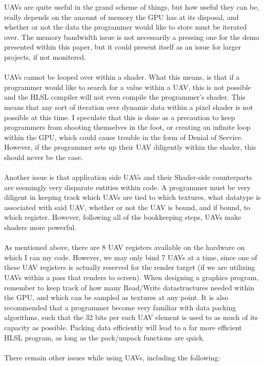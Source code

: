 \documentclass[a4paper, 12pt]{article}
\begin{document}
UAVs are quite useful in the grand scheme of things, but how useful they can
be, really depends on the amount of memory the GPU has at its disposal, and
whether or not the data the programmer would like to store must be iterated
over. The memory bandwidth issue is not necessarily a pressing one for the
demo presented within this paper, but it could present itself as an issue for
larger projects, if not monitered. \\ \\ UAVs cannot be looped over within a
shader. What this means, is that if a programmer would like to search for a
value within a UAV, this is not possible and the HLSL compiler will not even
compile the programmer's shader. This means that any sort of iteration over
dynamic data within a pixel shader is not possible at this time. I speculate
that this is done as a precaution to keep programmers from shooting themselves
in the foot, or creating an infinite loop within the GPU, which could cause
trouble in the form of Denial of Service. However, if the programmer sets up
their UAV diligently within the shader, this should never be the case. \\ \\
Another issue is that application side UAVs and their Shader-side counterparts
are seemingly very disparate entities within code. A programmer must be very
diligent in keeping track which UAVs are tied to which textures, what datatype
is associated with said UAV, whether or not the UAV is bound, and if bound, to
which register. However, following all of the bookkeeping steps, UAVs make
shaders more powerful. \\ \\ As mentioned above, there are 8 UAV registers
available on the hardware on which I ran my code. However, we may only bind 7
UAVs at a time, since one of these UAV registers is actually reserved for the
render target (if we are utilizing UAVs within a pass that renders to screen).
When designing a graphics program, remember to keep track of how many
Read/Write datastructures needed within the GPU, and which can be sampled as
textures at any point. It is also recommended that a programmer become very
familiar with data packing algorithms, such that the 32 bits per each UAV
element is used to as much of its capacity as possible. Packing data
efficiently will lead to a far more efficient HLSL program, as long as the
pack/unpack functions are quick. \\ \\ There remain other issues while using
UAVs, including the following:
\end{document}
